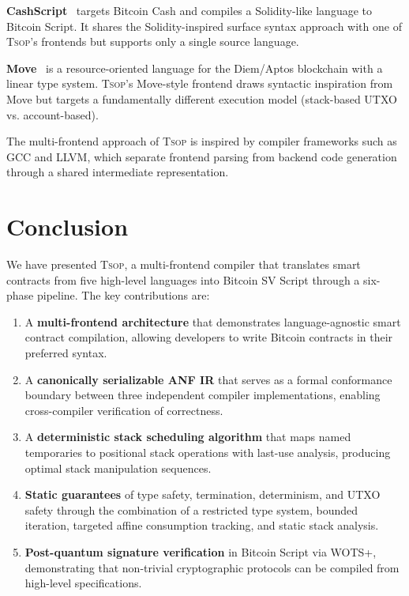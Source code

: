 \documentclass[11pt,a4paper]{article}
\newcommand{\tsop}{\textsc{Tsop}}
\begin{document}
\textbf{CashScript}~\cite{cashscript} targets Bitcoin Cash and compiles
a Solidity-like language to Bitcoin Script. It shares the Solidity-inspired
surface syntax approach with one of \tsop{}'s frontends but supports only a
single source language.

\textbf{Move}~\cite{move} is a resource-oriented language for the Diem/Aptos
blockchain with a linear type system. \tsop{}'s Move-style frontend draws
syntactic inspiration from Move but targets a fundamentally different
execution model (stack-based UTXO vs. account-based).

The multi-frontend approach of \tsop{} is inspired by compiler frameworks
such as GCC and LLVM, which separate frontend parsing from backend code
generation through a shared intermediate representation.

\section{Conclusion}
\label{sec:conclusion}

We have presented \tsop{}, a multi-frontend compiler that translates smart
contracts from five high-level languages into Bitcoin SV Script through a
six-phase pipeline. The key contributions are:

\begin{enumerate}[label=(\roman*)]
  \item A \textbf{multi-frontend architecture} that demonstrates
    language-agnostic smart contract compilation, allowing developers to
    write Bitcoin contracts in their preferred syntax.
  \item A \textbf{canonically serializable ANF IR} that serves as a formal
    conformance boundary between three independent compiler implementations,
    enabling cross-compiler verification of correctness.
  \item A \textbf{deterministic stack scheduling algorithm} that maps named
    temporaries to positional stack operations with last-use analysis,
    producing optimal stack manipulation sequences.
  \item \textbf{Static guarantees} of type safety, termination, determinism,
    and UTXO safety through the combination of a restricted type system,
    bounded iteration, targeted affine consumption tracking, and static
    stack analysis.
  \item \textbf{Post-quantum signature verification} in Bitcoin Script
    via WOTS+, demonstrating that non-trivial cryptographic protocols can
    be compiled from high-level specifications.
\end{enumerate}
\end{document}

